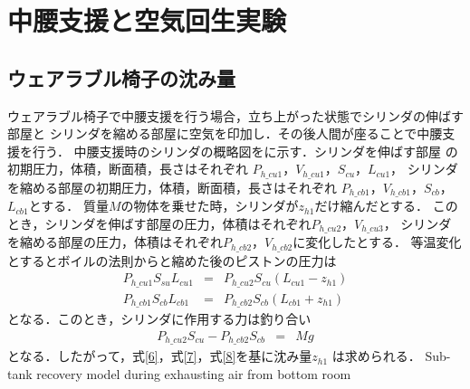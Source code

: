 \section{中腰支援と空気回生実験}
\subsection{ウェアラブル椅子の沈み量}
ウェアラブル椅子で中腰支援を行う場合，立ち上がった状態でシリンダの伸ばす部屋と
シリンダを縮める部屋に空気を印加し．その後人間が座ることで中腰支援を行う．
中腰支援時のシリンダの概略図をに示す．シリンダを伸ばす部屋
の初期圧力，体積，断面積，長さはそれぞれ
$P_{h\_cu1}$，$V_{h\_cu1}$，$S_{cu}$，$L_{cu1}$，
シリンダを縮める部屋の初期圧力，体積，断面積，長さはそれぞれ
$P_{h\_cb1}$，$V_{h\_cb1}$，$S_{cb}$，$L_{cb1}$とする．
質量$M$の物体を乗せた時，シリンダが$z_{h1}$だけ縮んだとする．
このとき，シリンダを伸ばす部屋の圧力，体積はそれぞれ$P_{h\_cu2}$，$V_{h\_cu3}$，
シリンダを縮める部屋の圧力，体積はそれぞれ$P_{h\_cb2}$，$V_{h\_cb2}$に変化したとする．
等温変化とするとボイルの法則からと縮めた後のピストンの圧力は
\begin{eqnarray}
        P_{h\_cu1}S_{su}L_{cu1} &=& P_{h\_cu2}S_{cu}(L_{cu1} - z_{h1}) \label{6} \\
        P_{h\_cb1}S_{cb}L_{cb1} &=& P_{h\_cb2}S_{cb}(L_{cb1} + z_{h1}) \label{7}
\end{eqnarray}
となる．このとき，シリンダに作用する力は釣り合い
\begin{eqnarray}
       P_{h\_cu2}S_{cu} - P_{h\_cb2}S_{cb}  &=& Mg\label{8}
\end{eqnarray}
となる．したがって，式\eqref{6}，式\eqref{7}，式\eqref{8}を基に沈み量$z_{h1}$
は求められる．
{}
{Sub-tank recovery model during exhausting air from bottom room}
